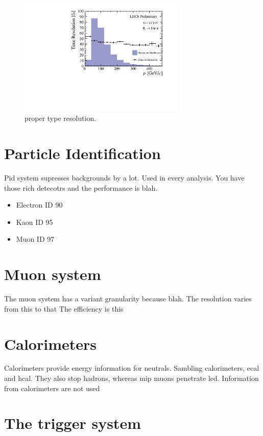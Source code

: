 \begin{figure}[t]
  \centering
  \includegraphics[width=0.7\textwidth]{Figures/Chapter2/final_decay_time_res_plot1}
  \caption{\lhcb proper type resolution.}
  \label{track_types}
\end{figure}


\section{Particle Identification}
Pid system supresses backgrounds by a lot.
Used in every analysis.
You have those rich detecotrs and the performance is blah.

\begin{itemize}
  \item Electron ID  90 %
  \item Kaon ID 95 %
  \item Muon ID 97 %
\end{itemize}

\section{Muon system}
The muon system has a variant granularity because blah.
The resolution varies from this to that
The efficiency is this

\section{Calorimeters}
\label{det_calo}
Calorimeters provide energy information for neutrals.
Sambling calorimeters, ecal and hcal.
They also stop hadrons, whereas mip muons penetrate led.
Information from calorimeters are not used

\section{The trigger system}
\label{det_trigger}

